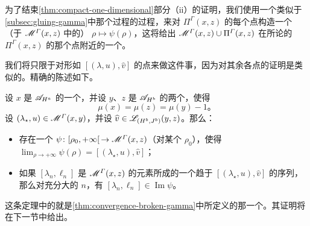 为了结束\cref{thm:compact-one-dimensional}部分（ii）的证明，我们使用一个类似于\cref{subsec:gluing-gamma}中那个过程的\trGluing{}过程，来对 $\Pi^{\varGamma}(x,z)$ 的每个点构造一个（于 $\mathscr{M}^{\varGamma}(x,z)$ 中的）\trEmbedding{} $\rho\mapsto\psi(\rho)$，这将给出\trManifoldWithBoundary{} $\mathscr{M}^{\varGamma}(x,z)\cup\Pi^{\varGamma}(x,z)$ 在所论的 $\Pi^{\varGamma}(x,z)$ 的那个点附近的一个\trParametrization。

我们将只限于对形如 $[(\lambda,u),\widehat{v}]$ 的点来做这件事，因为对其余各点的证明是类似的。精确的陈述如下。

\begin{theorem}\label{thm:gluing-near-broken}
设 $x$ 是 $\mathscr{A}_{H^{a}}$ 的一个\trCriticalPoint，并设 $y$、$z$ 是 $\mathscr{A}_{H^{b}}$ 的两个\trCriticalPoint，使得
\[
\mu(x)=\mu(z)=\mu(y)-1\text{。}
\]
设 $(\lambda_{\star},u)\in\mathscr{M}^{\varGamma}(x,y)$，并设 $\widehat{v}\in\mathscr{L}_{(H^{b},J^{b})}(y,z)$。那么：
\begin{itemize}
\item 存在一个\trEmbedding{} $\psi\colon[\rho_{0},+\infty[\,\to\mathscr{M}^{\varGamma}(x,z)$（对某个 $\rho_{0}$），使得 $\lim_{\rho\to+\infty}\psi(\rho)=[(\lambda_{\star},u),\widehat{v}]$；
\item 如果 $[\lambda_{n},\ell_{n}]$ 是 $\mathscr{M}^{\varGamma}(x,z)$ 的元素所成的一个趋于 $[(\lambda_{\star},u),\widehat{v}]$ 的序列，那么对充分大的 $n$，有 $[\lambda_{n},\ell_{n}]\in\operatorname{Im}\psi$。
\end{itemize}
\end{theorem}

这条定理中的\trConvergence{}就是\cref{thm:convergence-broken-gamma}中所定义的那一个。其证明将在下一节中给出。
